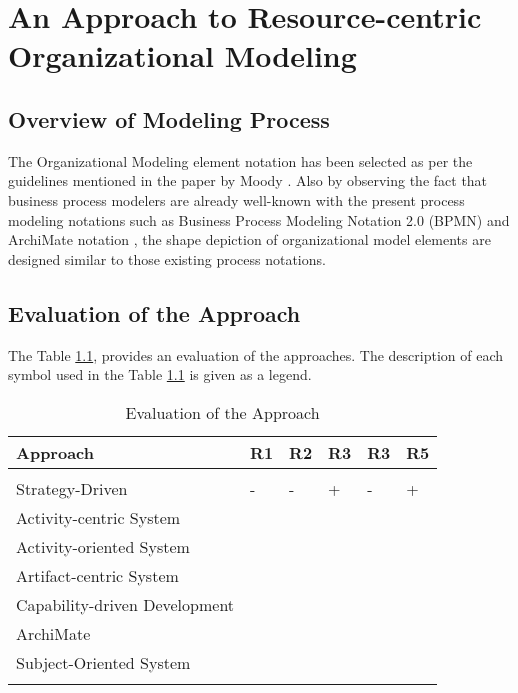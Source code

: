 \chapter{An Approach to Resource-centric Organizational Modeling}
\label{chap:approach}


\section{Overview of Modeling Process}
\label{sec:overviewmodelingprocess}
 The Organizational Modeling element notation has been selected as per the guidelines mentioned in the paper by Moody \cite{Moody2009}. Also by observing  the fact that business process modelers are already well-known with the present process modeling notations such as Business Process Modeling Notation 2.0 (BPMN) \cite{bpm2011} and ArchiMate notation \cite{arc2013}, the shape depiction of organizational model elements are designed similar to those existing process notations. 




\section{Evaluation of the Approach}
\label{sec:evaluationoftheapproach}

The Table \ref{tab:evaluationoftheapproach}, provides an evaluation of the approaches. The description of each symbol used in the  Table \ref{tab:evaluationoftheapproach} is given as a legend.


\begin{center}
	\begin{longtable}{p{5cm}p{2cm}p{2cm}p{2cm}p{2cm}p{2cm}} 
		\toprule 
		\textbf{Approach} & \textbf{R1}  & \textbf{R2}  & \textbf{R3}  & \textbf{R3}  & \textbf{R5} \\
		\midrule
		\endfirsthead
		\\
	   	Strategy-Driven & -  & -  & +  & -  & + \\
	   	Activity-centric System  \\
	   	Activity-oriented System  \\
	   	Artifact-centric System  \\
	   	Capability-driven Development \\
	   	ArchiMate \\
	    Subject-Oriented System \\
		
		\bottomrule
		\caption{Evaluation of the Approach}
		\label{tab:evaluationoftheapproach}
	\end{longtable}	
\end{center}

